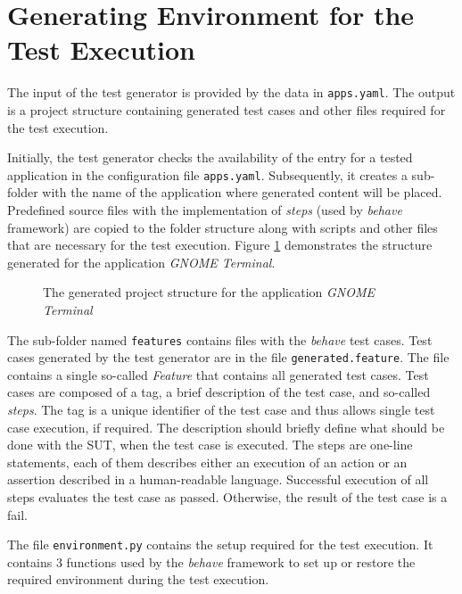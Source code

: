 \section{Generating Environment for the Test Execution}

The input of the test generator is provided by the data in \texttt{apps.yaml}. The output is a project structure containing generated test cases and other files required for the test execution. 

Initially, the test generator checks the availability of the entry for a tested application in the configuration file \texttt{apps.yaml}. Subsequently, it creates a sub-folder with the name of the application where generated content will be placed. Predefined source files with the implementation of \textit{steps} (used by \textit{behave} framework) are copied to the folder structure along with scripts and other files that are necessary for the test execution. Figure \ref{project_folder} demonstrates the structure generated for the application \textit{GNOME Terminal}.

\begin{figure}[H]
\caption{The generated project structure for the application \textit{GNOME Terminal}}
\label{project_folder}
\end{figure}

The sub-folder named \texttt{features} contains files with the \textit{behave} test cases. Test cases generated by the test generator are in the file \texttt{generated.feature}. The file contains a single so-called \textit{Feature} that contains all generated test cases. Test cases are composed of a tag, a brief description of the test case, and so-called \textit{steps}. The tag is a unique identifier of the test case and thus allows single test case execution, if required. The description should briefly define what should be done with the SUT, when the test case is executed. The steps are one-line statements, each of them describes either an execution of an action or an assertion described in a human-readable language. Successful execution of all steps evaluates the test case as passed. Otherwise, the result of the test case is a fail.

The file \texttt{environment.py} contains the setup required for the test execution. It contains 3 functions used by the \textit{behave} framework to set up or restore the required environment during the test execution. 

